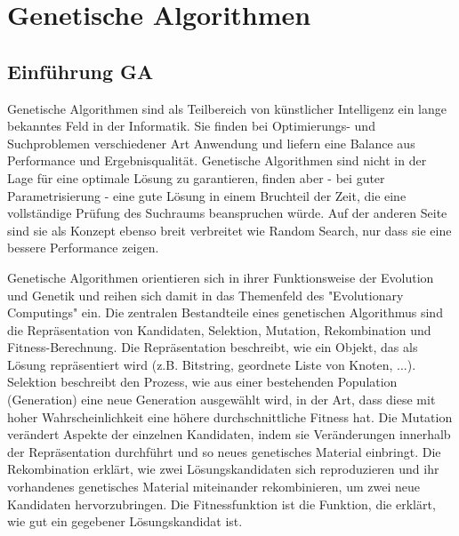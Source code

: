 \section{Genetische Algorithmen}
\label{Sec:GeneticAlgorithms}
\subsection{Einführung GA}
Genetische Algorithmen sind als Teilbereich von künstlicher Intelligenz ein lange bekanntes Feld in der Informatik. Sie finden bei Optimierungs- und Suchproblemen verschiedener Art Anwendung und liefern eine Balance aus Performance und Ergebnisqualität. Genetische Algorithmen sind nicht in der Lage für eine optimale Lösung zu garantieren, finden aber - bei guter Parametrisierung - eine gute Lösung in einem Bruchteil der Zeit, die eine vollständige Prüfung des Suchraums beanspruchen würde. Auf der anderen Seite sind sie als Konzept ebenso breit verbreitet wie Random Search, nur dass sie eine bessere Performance zeigen.

Genetische Algorithmen orientieren sich in ihrer Funktionsweise der Evolution und Genetik und reihen sich damit in das  Themenfeld des "Evolutionary Computings" ein.
Die zentralen Bestandteile eines genetischen Algorithmus sind die Repräsentation von Kandidaten, Selektion, Mutation, Rekombination und Fitness-Berechnung. Die Repräsentation beschreibt, wie ein Objekt, das als Lösung repräsentiert wird (z.B. Bitstring, geordnete Liste von Knoten, ...). Selektion beschreibt den Prozess, wie aus einer bestehenden Population (Generation) eine neue Generation ausgewählt wird, in der Art, dass diese mit hoher Wahrscheinlichkeit eine höhere durchschnittliche Fitness hat. Die Mutation verändert Aspekte der einzelnen Kandidaten, indem sie Veränderungen innerhalb der Repräsentation durchführt und so neues genetisches Material einbringt. Die Rekombination erklärt, wie zwei Lösungskandidaten sich reproduzieren und ihr vorhandenes genetisches Material miteinander rekombinieren, um zwei neue Kandidaten hervorzubringen. Die Fitnessfunktion ist die Funktion, die erklärt, wie gut ein gegebener Lösungskandidat ist.

